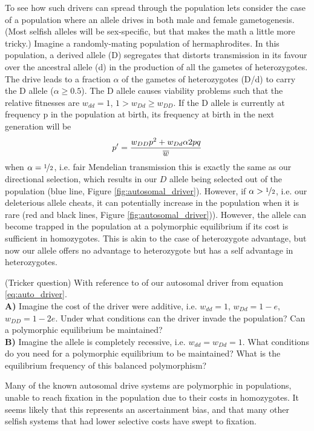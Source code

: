 {To see how such drivers can spread through the population lets
consider the case of a population where an allele drives in both male
and female gametogenesis. (Most selfish alleles will be sex-specific,
but that makes the math a little more tricky.)
Imagine a randomly-mating population of hermaphrodites. In this
population, a derived allele (D) segregates that distorts transmission
in its favour over the ancestral allele (d) in the production of all
the gametes of heterozygotes. The drive leads to a fraction $\alpha$ of the gametes
of heterozygotes (D/d) to carry the D allele ($\alpha \geq 0.5$). The D allele
causes viability problems such that the
relative fitnesses are $w_{dd}=1$, $1 > w_{Dd} \geq w_{DD}$. If the D allele
is currently at frequency p in the population at birth, its frequency
at birth in the next generation will be
\begin{equation}
p^{\prime}=\frac{w_{DD}p^2 + w_{Dd} \alpha 2pq  }{\overline{w}} \label{eq:auto_driver}
 \end{equation}
when $\alpha=\nicefrac{1}{2}$, i.e. fair Mendelian transmission this is exactly the same as our directional selection, which results in our $D$
allele being selected out of the population (blue line, Figure \ref{fig:autosomal_driver}). However, if
$\alpha>\nicefrac{1}{2}$, i.e. our deleterious allele cheats, it can potentially
increase in the population when it is rare (red and black lines,
Figure \ref{fig:autosomal_driver})). However, the allele can become
trapped in the population at a polymorphic equilibrium if its cost is
sufficient in homozygotes. This is akin to the case of heterozygote
advantage, but now our allele offers no advantage to heterozygote but
has a self advantage in heterozygotes.

\begin{question} (Tricker question)
  With reference to of our autosomal driver from equation
  \ref{eq:auto_driver}.\\
  {\bf A)}	Imagine the cost of the driver were additive, i.e.  $w_{dd}=1$, $w_{Dd}=1-e$, $w_{DD}=1-2e$. Under what conditions can the
driver invade the population? Can a polymorphic equilibrium be maintained?\\
{\bf B)}	Imagine the allele is completely recessive, i.e. $w_{dd}=w_{Dd}=1$. What conditions do you need for a polymorphic equilibrium to be maintained? What is the equilibrium frequency of this balanced polymorphism?\\
\end{question}

Many of the known autosomal drive systems are polymorphic in
populations, unable to reach fixation in the population due to their
costs in homozygotes. It seems likely that this represents an
ascertainment bias, and that many other selfish systems that had
lower selective costs have swept to
fixation. 

}
